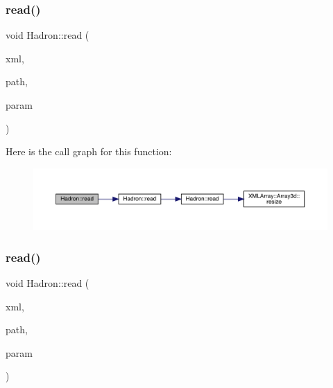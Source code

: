 \subsubsection{\texorpdfstring{read()}{read()}\hspace{0.1cm}{\footnotesize\ttfamily [39/94]}}
{\footnotesize\ttfamily void Hadron\+::read (\begin{DoxyParamCaption}\item[{\mbox{\hyperlink{classADATXML_1_1XMLReader}{X\+M\+L\+Reader}} \&}]{xml,  }\item[{const std\+::string \&}]{path,  }\item[{\mbox{\hyperlink{structHadron_1_1HadronAdjMapTarget__t}{Hadron\+Adj\+Map\+Target\+\_\+t}} \&}]{param }\end{DoxyParamCaption})}

Here is the call graph for this function\+:
\nopagebreak
\begin{figure}[H]
\begin{center}
\leavevmode
\includegraphics[width=350pt]{d1/daf/namespaceHadron_a9a69bb90cd1c62da66808573864f7cd1_cgraph}
\end{center}
\end{figure}
\mbox{\label{namespaceHadron_a83c06845cd19520623de3b0074b9d25c}} 
\subsubsection{\texorpdfstring{read()}{read()}\hspace{0.1cm}{\footnotesize\ttfamily [40/94]}}
{\footnotesize\ttfamily void Hadron\+::read (\begin{DoxyParamCaption}\item[{\mbox{\hyperlink{classADATXML_1_1XMLReader}{X\+M\+L\+Reader}} \&}]{xml,  }\item[{const std\+::string \&}]{path,  }\item[{\mbox{\hyperlink{structHadron_1_1HadronVertex__t}{Hadron\+Vertex\+\_\+t}} \&}]{param }\end{DoxyParamCaption})}



